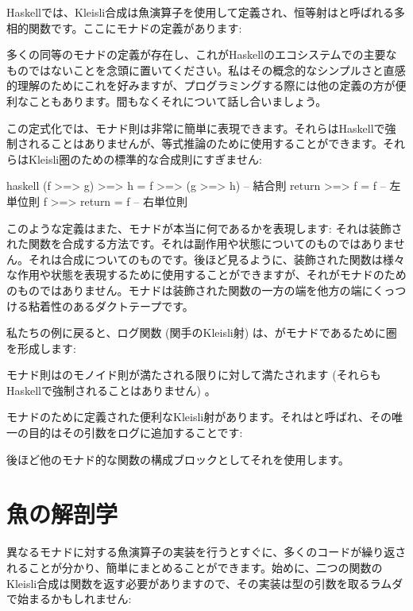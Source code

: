 Haskellでは、Kleisli合成は魚演算子\code{>=>}を使用して定義され、恒等射はと呼ばれる多相的関数です。ここにモナドの定義があります: 

多くの同等のモナドの定義が存在し、これがHaskellのエコシステムでの主要なものではないことを念頭に置いてください。私はその概念的なシンプルさと直感的理解のためにこれを好みますが、プログラミングする際には他の定義の方が便利なこともあります。間もなくそれについて話し合いましょう。

この定式化では、モナド則は非常に簡単に表現できます。それらはHaskellで強制されることはありませんが、等式推論のために使用することができます。それらはKleisli圏のための標準的な合成則にすぎません: 

\begin{snip}{haskell}
(f >=> g) >=> h = f >=> (g >=> h) -- 結合則
return >=> f = f                  -- 左単位則
f >=> return = f                  -- 右単位則
\end{snip}
このような定義はまた、モナドが本当に何であるかを表現します: それは装飾された関数を合成する方法です。それは副作用や状態についてのものではありません。それは合成についてのものです。後ほど見るように、装飾された関数は様々な作用や状態を表現するために使用することができますが、それがモナドのためのものではありません。モナドは装飾された関数の一方の端を他方の端にくっつける粘着性のあるダクトテープです。

私たちの例に戻ると、ログ関数 (関手のKleisli射) は、がモナドであるために圏を形成します: 

モナド則はのモノイド則が満たされる限りに対して満たされます (それらもHaskellで強制されることはありません) 。

モナドのために定義された便利なKleisli射があります。それはと呼ばれ、その唯一の目的はその引数をログに追加することです: 

後ほど他のモナド的な関数の構成ブロックとしてそれを使用します。

\section{魚の解剖学}

異なるモナドに対する魚演算子の実装を行うとすぐに、多くのコードが繰り返されることが分かり、簡単にまとめることができます。始めに、二つの関数のKleisli合成は関数を返す必要がありますので、その実装は型の引数を取るラムダで始まるかもしれません: 

